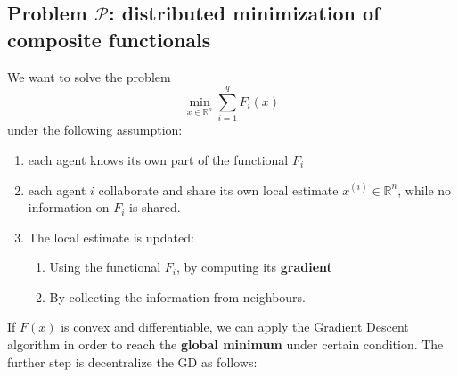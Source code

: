 \subsection{Problem $\mathcal{P}$: distributed minimization of composite functionals}
We want to solve the problem
\begin{equation*}
    \min_{x\in\mathbb{R}^n}  \sum_{i=1}^q F_i(x) 
\end{equation*}
under the following assumption: 
\begin{enumerate}
    \item each agent knows its own part of the functional $F_i$
    \item each agent $i$ collaborate and share its own local estimate $x^{(i)}\in\mathbb{R}^n$, while no information on $F_i$ is shared.
    \item The local estimate is updated:
    \begin{enumerate}
        \item Using the functional $F_i$, by computing its \textbf{gradient}
        \item By collecting the information from neighbours.
    \end{enumerate}
\end{enumerate}

If $F(x)$ is convex and differentiable, we can apply the Gradient Descent algorithm in order to reach the \textbf{global minimum} under certain condition. The further step is decentralize the GD as follows:\\

